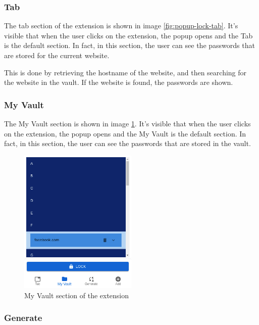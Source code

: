 \subsubsection {Tab}

The tab section of the extension is shown in image \ref{fig:popup-lock-tab}. It's visible that when the user clicks on the extension, the popup opens and the Tab is the default section. In fact, in this section, the user can see the passwords that are stored for the current website.

This is done by retrieving the hostname of the website, and then searching for the website in the vault. If the website is found, the passwords are shown.

\subsubsection {My Vault}

The My Vault section is shown in image \ref{fig:my-vault}. It's visible that when the user clicks on the extension, the popup opens and the My Vault is the default section. In fact, in this section, the user can see the passwords that are stored in the vault.
\begin{figure}[h!]
    \centering
    \vspace{0.5cm}
    \includegraphics[width=0.5\textwidth]{images/extension/my-vault.png}
    \caption{My Vault section of the extension}
    \label{fig:my-vault} %
\end{figure}

\subsubsection{Generate}

